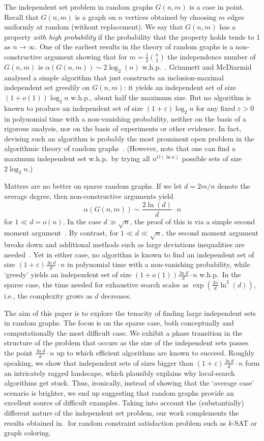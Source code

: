 \documentclass[a4paper,10pt]{article}
\newcommand\eps{\varepsilon}
\newcommand{\bink}[2] {{{#1}\choose {#2}}}
\newcommand{\whp}{w.h.p.}
\begin{document}
The independent set problem in random graphs $G(n,m)$ is a case
in point. Recall that $G(n,m)$ is a graph on $n$ vertices obtained
by choosing $m$ edges uniformly at random (without replacement).
We say that $G(n,m)$ has a property \emph{with high probability}
if the probability that the property holds tends to 1 as $n\rightarrow\infty$.
One of the earliest results in the theory of random graphs is a
non-constructive argument showing that for $m=\frac12\bink{n}2$
the independence number of $G(n,m)$ is $\alpha(G(n,m))\sim2\log_2(n)$
\whp~\cite{BollobasIS,erdos-1st,matula}. Grimmett and McDiarmid~\cite{grimmett}
analysed a simple algorithm that just constructs an inclusion-maximal
independent set greedily on $G(n,m)$: it yields an independent set
of size $(1+o(1))\log_2n$ \whp, about half the maximum size. But no
algorithm is known to produce an independent set of size $(1+\eps)
\log_2n$ for any fixed $\eps>0$ in polynomial time with a non-vanishing
probability, neither on the basis of a rigorous analysis, nor on
the basis of experiments or other evidence. In fact, devising such
an algorithm is probably the most prominent open problem in the
algorithmic theory of random graphs~\cite{friezeRSA,KarpOLD}. (However,
note that one can find a maximum independent set \whp\ by trying all
$n^{O(\ln n)}$ possible sets of size $2\log_2n$.)


Matters are no better on sparse random graphs. If we let $d=2m/n$
denote the average degree, then non-constructive arguments yield
	$$\alpha(G(n,m))\sim\frac{2\ln(d)}d\cdot n$$
for $1\ll d=o(n)$.
In the case $d\gg\sqrt n$, the proof of this is via a simple
second moment argument~\cite{BollobasIS,matula}. By contrast, for
$1\ll d\ll\sqrt n$, the second moment argument breaks down and
additional methods such as large deviations inequalities are 
needed~\cite{frieze-is}. Yet in either case, no algorithm is known
to find an independent set of size $(1+\eps)\frac{\ln d}d\cdot n$ in 
polynomial time with a non-vanishing probability, while `greedy' yields
an independent set of size $(1+o(1))\frac{\ln d}d\cdot n$ \whp\
In the sparse case, the time needed for exhaustive search scales
as $\exp(\frac{2n}{d}\ln^2(d))$, i.e., the complexity grows as
$d$ decreases.


The aim of this paper is to explore the tenacity
of finding large independent sets in random graphs. The focus is on
the sparse case, both conceptually and computationally  the most
difficult case. We exhibit a phase transition in the structure of the
problem that occurs as the size of the independent sets passes the
point $\frac{\ln d}d\cdot n$ up to which efficient algorithms are
known to succeed. Roughly speaking, we show that independent sets of
sizes bigger than $(1+\eps)\frac{\ln d}d\cdot n$ form an intricately
ragged landscape, which plausibly explains why local-search algorithms get
stuck. Thus, ironically, instead of showing that the `average case'
scenario is brighter, we end up suggesting that random graphs provide
an excellent source of difficult examples. Taking into account the (substantially)
different nature of the independent set problem, our work complements
the results obtained in~\cite{AchCoOg} for random constraint satisfaction
problem such as $k$-SAT or graph coloring.
\end{document}
